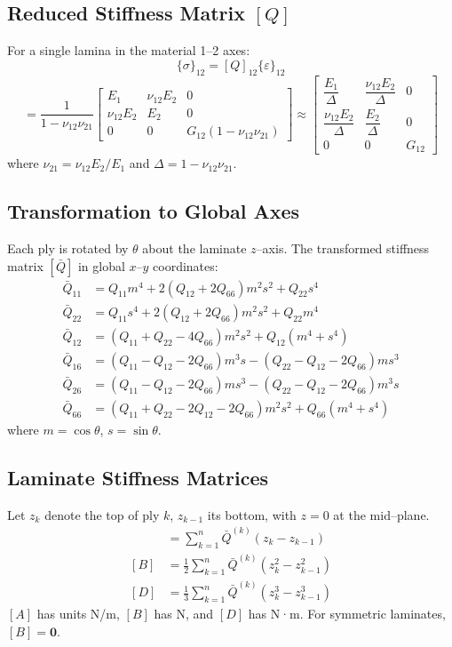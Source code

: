 \documentclass[12pt,a4paper]{article}
\begin{document}
\subsection{Reduced Stiffness Matrix $[Q]$}
For a single lamina in the material 1--2 axes:
\begin{equation}
\{\sigma\}_{12} = [Q]_{12} \{\varepsilon\}_{12}
\end{equation}
%
\begin{equation}
[Q] =
\frac{1}{1 - \nu_{12}\nu_{21}}
\begin{bmatrix}
E_1 & \nu_{12}E_2 & 0\\
\nu_{12}E_2 & E_2 & 0\\
0 & 0 & G_{12}(1-\nu_{12}\nu_{21})
\end{bmatrix}
\approx
\begin{bmatrix}
\dfrac{E_1}{\Delta} & \dfrac{\nu_{12}E_2}{\Delta} & 0\\[4pt]
\dfrac{\nu_{12}E_2}{\Delta} & \dfrac{E_2}{\Delta} & 0\\[4pt]
0 & 0 & G_{12}
\end{bmatrix}
\end{equation}
%
where $\nu_{21}=\nu_{12}E_2/E_1$ and $\Delta=1-\nu_{12}\nu_{21}$.

\subsection{Transformation to Global Axes}
Each ply is rotated by $\theta$ about the laminate $z$--axis.  
The transformed stiffness matrix $[\bar Q]$ in global $x$--$y$ coordinates:
\begin{align}
\bar Q_{11} &= Q_{11}m^4 + 2(Q_{12}+2Q_{66})m^2s^2 + Q_{22}s^4\\
\bar Q_{22} &= Q_{11}s^4 + 2(Q_{12}+2Q_{66})m^2s^2 + Q_{22}m^4\\
\bar Q_{12} &= (Q_{11}+Q_{22}-4Q_{66})m^2s^2 + Q_{12}(m^4+s^4)\\
\bar Q_{16} &= (Q_{11}-Q_{12}-2Q_{66})m^3s - (Q_{22}-Q_{12}-2Q_{66})ms^3\\
\bar Q_{26} &= (Q_{11}-Q_{12}-2Q_{66})ms^3 - (Q_{22}-Q_{12}-2Q_{66})m^3s\\
\bar Q_{66} &= (Q_{11}+Q_{22}-2Q_{12}-2Q_{66})m^2s^2 + Q_{66}(m^4+s^4)
\end{align}
where $m=\cos\theta$, $s=\sin\theta$.

\subsection{Laminate Stiffness Matrices}
Let $z_k$ denote the top of ply $k$, $z_{k-1}$ its bottom, with $z=0$ at the mid--plane.
\begin{align}
[A] &= \sum_{k=1}^{n}\bar Q^{(k)}(z_k-z_{k-1})\\
[B] &= \frac{1}{2}\sum_{k=1}^{n}\bar Q^{(k)}(z_k^2-z_{k-1}^2)\\
[D] &= \frac{1}{3}\sum_{k=1}^{n}\bar Q^{(k)}(z_k^3-z_{k-1}^3)
\end{align}
$[A]$ has units N/m, $[B]$ has N, and $[D]$ has N·m.  
For symmetric laminates, $[B]=\mathbf{0}$.
\end{document}
